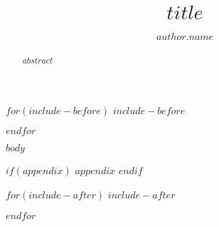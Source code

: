\documentclass[a4paper,$if(lipics.anonymous)$anonymous,$endif$UKenglish,cleveref,autoref,thm-restate]{lipics-v2021}
\title{$title$}
\author{$author.name$}{$author.affiliation$}{$author.email$}{$author.orcid$}{$author.funding$}
\begin{document}
\maketitle

\begin{abstract}
    $abstract$
\end{abstract}

$for(include-before)$
$include-before$

$endfor$

$body$



$if(appendix)$
\appendix
$appendix$
$endif$

$for(include-after)$
$include-after$

$endfor$
\end{document}
